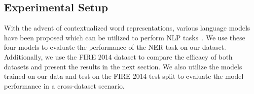 \documentclass[10pt, a4paper]{article}
\begin{document}
\begin{table*}[!h]
\centering
{}
\caption{Test Set F1-Score of various pre-trained LMs on our HiNER dataset (Collapsed). This table reports a mean F1-score and its standard deviation over 5 runs.}
\label{tab:collapsedResultsOurDatasetLabel}
\end{table*}

\subsection{Experimental Setup}

With the advent of contextualized word representations, various language models have been proposed which can be utilized to perform NLP tasks~\cite{devlin2018bert,conneau-etal-2020-unsupervised,kakwani2020inlpsuite,khanuja2021muril}. We use these four models to evaluate the performance of the NER task on our dataset. Additionally, we use the FIRE 2014 dataset to compare the efficacy of both datasets and present the results in the next section. We also utilize the models trained on our data and test on the FIRE 2014 test split to evaluate the model performance in a cross-dataset scenario. 
\end{document}
